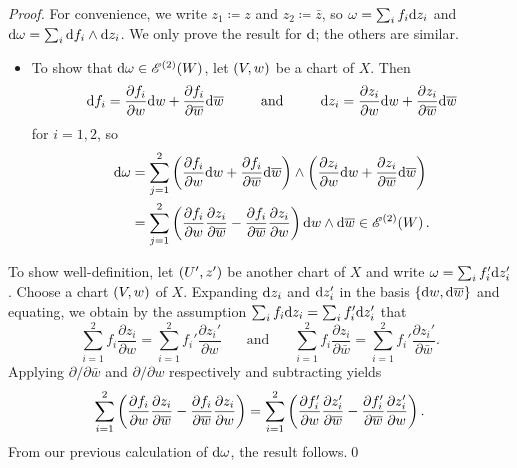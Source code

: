 \documentclass[../Moduli_Spaces_of_Riemann_Surfaces.tex]{subfiles}
\begin{document}
    \begin{proof}
        For convenience, we write $z_1\coloneqq z$ and $z_2\coloneqq\bar{z}$, so $\omega=\sum_if_i\mathrm{d} z_i$ and $\mathrm{d}\omega=\sum_i\mathrm{d} f_i\wedge\mathrm{d} z_i$. We only prove the result for $\mathrm{d}$; the others are similar.
        \begin{itemize}
            \item To show that $\mathrm{d}\omega\in\mathscr{E}^{\left(2\right)}\!\left(W\right)$, let $\left(V,w\right)$ be a chart of $X$. Then
                \begin{equation*}
                    \d f_i=\frac{\partial f_i}{\partial w}\d w+\frac{\partial f_i}{\partial\bar{w}}\d\bar{w}\ \ \ \ \ \ \ \ \textrm{and}\ \ \ \ \ \ \ \ \d z_i=\frac{\partial z_i}{\partial w}\d w+\frac{\partial z_i}{\partial\bar{w}}\d\bar{w}
                \end{equation*}
                for $i=1,2$, so
                \begin{equation*}
                    \begin{aligned}
                        \mathrm{d}\omega&=\sum_{j=1}^{2}\left(\frac{\partial f_i}{\partial w}\mathrm{d} w+\frac{\partial f_i}{\partial\overline{w}}\mathrm{d}\overline{w}\right)\wedge\left(\frac{\partial z_i}{\partial w}\mathrm{d} w+\frac{\partial z_i}{\partial\overline{w}}\mathrm{d}\overline{w}\right) \\
                                &=\sum_{j=1}^{2}\left(\frac{\partial f_i}{\partial w}\frac{\partial z_i}{\partial\overline{w}}-\frac{\partial f_i}{\partial\overline{w}}\frac{\partial z_i}{\partial w}\right)\mathrm{d} w\wedge\mathrm{d}\overline{w}\in\mathscr{E}^{\left(2\right)}\!\left(W\right).
                    \end{aligned}
                \end{equation*}
        \end{itemize}
        To show well-definition, let $\left(U',z'\right)$ be another chart of $X$ and write $\omega=\sum_if_i'\mathrm{d} z_i'$. Choose a chart $\left(V,w\right)$ of $X$. Expanding $\mathrm{d} z_i$ and $\mathrm{d} z_i'$ in the basis $\left\{\mathrm{d} w,\mathrm{d}\overline{w}\right\}$ and equating, we obtain by the assumption $\sum_if_i\mathrm{d} z_i=\sum_if_i'\mathrm{d} z_i'$ that
        \begin{equation*}
            \sum_{i=1}^{2}f_i\frac{\partial z_i}{\partial w}=\sum_{i=1}^{2}f_i'\frac{\partial z_i'}{\partial w}\ \ \ \ \ \ \ \ \textrm{and}\ \ \ \ \ \ \ \ \sum_{i=1}^{2}f_i\frac{\partial z_i}{\partial\bar{w}}=\sum_{i=1}^{2}f_i'\frac{\partial z_i'}{\partial\bar{w}}.
        \end{equation*}
        Applying $\partial/\partial\bar{w}$ and $\partial/\partial w$ respectively and subtracting yields
        \begin{equation*}
            \sum_{i=1}^{2}\left(\frac{\partial f_i}{\partial w}\frac{\partial z_i}{\partial\overline{w}}-\frac{\partial f_i}{\partial\overline{w}}\frac{\partial z_i}{\partial w}\right)=\sum_{i=1}^{2}\left(\frac{\partial f_i'}{\partial w}\frac{\partial z_i'}{\partial\overline{w}}-\frac{\partial f_i'}{\partial\overline{w}}\frac{\partial z_i'}{\partial w}\right).
        \end{equation*}
        From our previous calculation of $\mathrm{d}\omega$, the result follows.\qed
    \end{proof}
\end{document}
